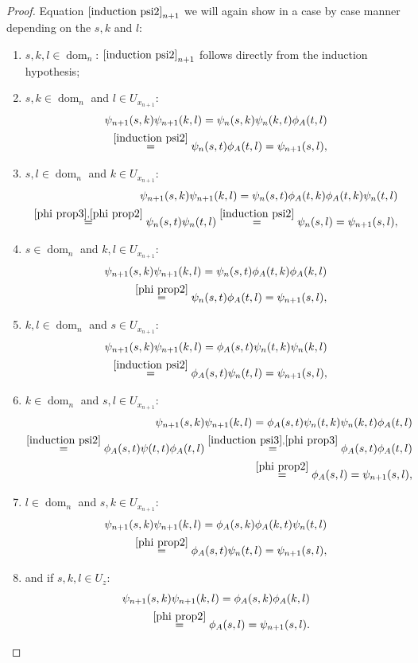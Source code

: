 \documentclass[b5paper,draft,openbib,12pt]{memoir}
\DeclareMathOperator{\dom}{dom}
\begin{document}
\begin{proof}
Equation \(\eqref{induction psi2}_{n+1}\) we will again show in a case 
by case manner depending on the \(s,k\) and \(l\):
\begin{enumerate}
\item \(s,k,l\in \dom_{n}\): 
\(\eqref{induction psi2}_{n+1}\) follows directly from the induction hypothesis;
\item  \(s,k\in \dom_{n}\) and \(l\in U_{x_{n+1}}\):
\begin{align}\nonumber
\psi_{n+1}(s,k)\psi_{n+1}(k,l)=\psi_n(s,k)\psi_n(k,t)\phi_A(t,l)\\
\overset{\eqref{induction psi2}}{=} \psi_n(s,t)\phi_A(t,l)=\psi_{n+1}(s,l),
\end{align}
\item \(s,l\in \dom_n\) and  \(k\in U_{x_{n+1}}\): 
\begin{align*}
\psi_{n+1}(s,k)\psi_{n+1}(k,l)=\psi_{n}(s,t)\phi_A(t,k)\phi_A(t,k)\psi_n(t,l)\\
\overset{\eqref{phi prop3},\eqref{phi prop2}}{=}\psi_{n}(s,t)\psi_n(t,l)\overset{\eqref{induction psi2}}{=}\psi_n(s,l)=\psi_{n+1}(s,l),
\end{align*}
\item  \(s\in \dom_n\) and  \(k,l\in U_{x_{n+1}}\):
\begin{align*}
\psi_{n+1}(s,k)\psi_{n+1}(k,l)=\psi_n(s,t)\phi_A(t,k)\phi_A(k,l)\\
\overset{\eqref{phi prop2}}{=}\psi_n(s,t)\phi_A(t,l)
=\psi_{n+1}(s,l),
\end{align*}
\item \(k,l\in \dom_n\) and  \(s\in U_{x_{n+1}}\): 
\begin{align*}
\psi_{n+1}(s,k)\psi_{n+1}(k,l)=\phi_A(s,t)\psi_n(t,k)\psi_n(k,l)\\
\overset{\eqref{induction psi2}}{=}\phi_A(s,t)\psi_n(t,l)=\psi_{n+1}(s,l),
\end{align*}
\item  \(k\in \dom_n\) and  \(s,l\in U_{x_{n+1}}\):
\begin{align*}
\psi_{n+1}(s,k)\psi_{n+1}(k,l)=\phi_A(s,t)\psi_n(t,k)\psi_n(k,t)\phi_A(t,l)\\
\overset{\eqref{induction psi2}}{=}\phi_A(s,t)\psi(t,t)\phi_A(t,l)
\overset{\eqref{induction psi3},\eqref{phi prop3}}{=}\phi_A(s,t)\phi_A(t,l)\\
\overset{\eqref{phi prop2}}{=} \phi_A(s,l)=\psi_{n+1}(s,l),
\end{align*}
\item \(l\in \dom_n\) and  \(s,k\in U_{x_{n+1}}\):
\begin{align*}
\psi_{n+1}(s,k)\psi_{n+1}(k,l)=\phi_A(s,k)\phi_A(k,t)\psi_n(t,l)\\
\overset{\eqref{phi prop2}}{=}\phi_A(s,t)\psi_n(t,l)=\psi_{n+1}(s,l),
\end{align*}
\item and if \(s,k,l\in U_z\): 
\begin{align*}
\psi_{n+1}(s,k)\psi_{n+1}(k,l)=\phi_A(s,k)\phi_A(k,l)\\
\overset{\eqref{phi prop2}}{=}\phi_A(s,l)=\psi_{n+1}(s,l).
\end{align*}
\end{enumerate}


\end{proof}
\end{document}
